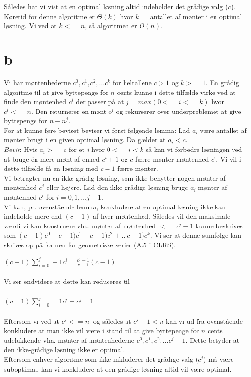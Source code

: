\documentclass[10pt,a4paper,danish]{article}
\begin{document}
Således har vi vist at en optimal løsning altid indeholder det grådige valg ($c$). Køretid for denne
algoritme er $\Theta(k)$ hvor $k =$ antallet af mønter i en optimal løsning. Vi ved at $k <= n$, så algoritmen
er $O(n)$. 

\section{b}
Vi har møntenhederne $c^0, c^1, c^2, \ldots c^k$ for heltallene $c > 1$ og $k >= 1$. En grådig 
algoritme til at give byttepenge for $n$ cents kunne i dette tilfælde virke ved at finde den 
møntenhed $c^j$ der passer på at $j = max(0 <= i <= k)$ hvor $c^i <= n$. Den returnerer en mønt 
$c^j$ og rekurserer over underproblemet at give byttepenge for $n - n^j$. 
\\
For at kunne føre beviset beviser vi først følgende lemma:  Lad $a_i$ være antallet af mønter brugt
i en given optimal løsning. Da gælder at $a_i < c$. 
\\
\emph{Bevis}: Hvis $a_i >= c$ for et $i$ hvor $0 <= i < k$ så kan vi forbedre løsningen ved at bruge
én mere mønt af enhed $ c^i+1$ og $c$ færre mønter møntenhed $c^i$. Vi vil i dette tilfælde få en 
løsning med $c - 1$ færre mønter. 
\\
Vi betragter nu en ikke-grådig løsning, som ikke benytter nogen mønter af møntenhed $c^j$ eller 
højere. Lad den ikke-grådige løsning bruge $a_i$ mønter af møntenhed $c^i$ for $
i = 0, 1, \ldots j-1$. 
\\
Vi kan, pr. ovenstående lemma, konkludere at en optimal løsning ikke kan indeholde mere end
$(c-1)$ af hver møntenhed. Således vil den maksimale værdi vi kan konstruere vha. mønter
af møntenhed $<= c^j-1$ kunne beskrives som $(c-1)c^0 + c-1)c^1 +c-1)c^2 + \ldots c-1)c^k$.
Vi ser at denne sumfølge kan skrives op på formen for geometriske serier (A.5 i CLRS): 

$\displaystyle (c-1)\sum\limits_{i=0}^j-1 c^i = \frac{c^j - 1}{c -1} (c - 1)$
\\
\\
Vi ser endvidere at dette kan reduceres til
\\
\\
$\displaystyle (c-1)\sum\limits_{i=0}^j-1 c^i = c^j - 1$
\\
\\
Eftersom vi ved at $c^j <= n$, og således at $c^j - 1 < n$ kan vi ud fra ovenstående 
konkludere at man ikke vil være i stand til at give byttepenge for $n$ cents udelukkende
vha. mønter af møntenhederne $c^0, c^1, c^2, \ldots c^j-1$. Dette betyder at den ikke-grådige
løsning ikke er optimal. 
\\
Eftersom enhver algoritme som ikke inkluderer det grådige valg ($c^j$) må være suboptimal, 
kan vi konkludere at den grådige løsning altid vil være optimal. 
\end{document}
